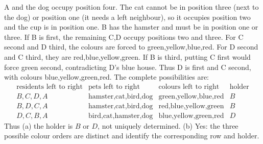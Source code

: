 A and the dog occupy position four. The cat cannot be in position three (next to the dog) or position one (it needs a left neighbour), so it occupies position two and the cup is in position one. B has the hamster and must be in position one or three.
If B is first, the remaining C,D occupy positions two and three. For C second and D third, the colours are forced to green,yellow,blue,red. For D second and C third, they are red,blue,yellow,green.
If B is third, putting C first would force green second, contradicting D's blue house. Thus D is first and C second, with colours blue,yellow,green,red.
The complete possibilities are:
\[\begin{array}{c|c|c|c}
\text{residents left to right}&\text{pets left to right}&\text{colours left to right}&\text{holder}\\
B,C,D,A&\text{hamster,cat,bird,dog}&\text{green,yellow,blue,red}&B\\
B,D,C,A&\text{hamster,cat,bird,dog}&\text{red,blue,yellow,green}&B\\
D,C,B,A&\text{bird,cat,hamster,dog}&\text{blue,yellow,green,red}&D
\end{array}\]
Thus (a) the holder is $\boxed{B\text{ or }D}$, not uniquely determined. (b) Yes: the three possible colour orders are distinct and identify the corresponding row and holder.

